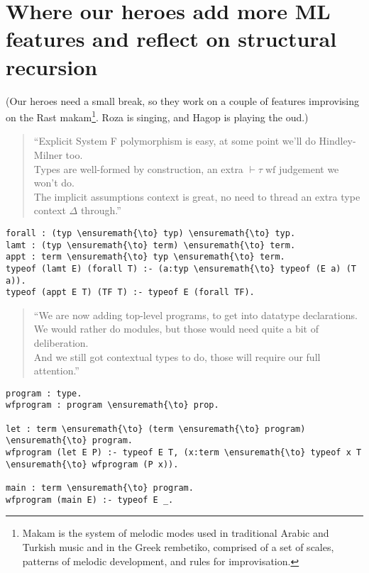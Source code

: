 \section{Where our heroes add more ML features and reflect on structural
recursion}\label{where-our-heroes-add-more-ml-features-and-reflect-on-structural-recursion}

\begin{scenecomment}
(Our heroes need a small break, so they work on a couple of features improvising on the Rast makam\footnote{Makam is the system of melodic modes used in traditional Arabic and Turkish music and in the Greek rembetiko, comprised of a set of scales, patterns of melodic development, and rules for improvisation.}. Roza is singing, and Hagop is playing the oud.)
\end{scenecomment}

\begin{verse}
``Explicit System F polymorphism is easy, at some point we'll do Hindley-Milner too. \\
Types are well-formed by construction, an extra $\vdash \tau \; \text{wf}$ judgement we won't do. \\
The implicit assumptions context is great, no need to thread an extra type context $\Delta$ through.''
\end{verse}

\begin{verbatim}
forall : (typ \ensuremath{\to} typ) \ensuremath{\to} typ.
lamt : (typ \ensuremath{\to} term) \ensuremath{\to} term.
appt : term \ensuremath{\to} typ \ensuremath{\to} term.
typeof (lamt E) (forall T) :- (a:typ \ensuremath{\to} typeof (E a) (T a)).
typeof (appt E T) (TF T) :- typeof E (forall TF).
\end{verbatim}

\begin{verse}
``We are now adding top-level programs, to get into datatype declarations. \\
We would rather do modules, but those would need quite a bit of deliberation. \\
And we still got contextual types to do, those will require our full attention.''
\end{verse}

\begin{verbatim}
program : type.
wfprogram : program \ensuremath{\to} prop.

let : term \ensuremath{\to} (term \ensuremath{\to} program) \ensuremath{\to} program.
wfprogram (let E P) :- typeof E T, (x:term \ensuremath{\to} typeof x T \ensuremath{\to} wfprogram (P x)).

main : term \ensuremath{\to} program.
wfprogram (main E) :- typeof E _.
\end{verbatim}


